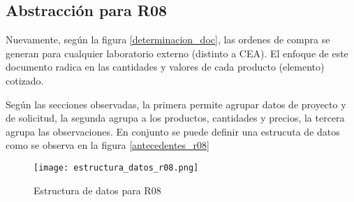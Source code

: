 \subsection{Abstracción para R08}

Nuevamente, según la  figura \ref{determinacion_doc}, las ordenes de compra se generan para cualquier laboratorio externo (distinto a CEA). El enfoque de este documento radica en las cantidades y valores de cada producto (elemento) cotizado.

Según las secciones observadas, la primera permite agrupar datos de proyecto y de solicitud, la segunda agrupa a los productos, cantidades y precios, la tercera agrupa las observaciones. En conjunto se puede definir una estrucuta de datos como se observa en la figura \ref{antecedentes_r08}


\begin{figure}
	\centering
	\texttt{[image: estructura\_datos\_r08.png]}
	\caption{Estructura de datos para R08}
	\label{estructura_datos_r08}
\end{figure}

